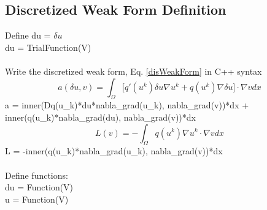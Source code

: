 \documentclass[12pt,3p]{article}
\begin{document}
\subsection{Discretized Weak Form Definition}
Define du = $\delta u$ \\
{\selectfont
du = TrialFunction(V) \\ \\
}
Write the discretized weak form, Eq. \ref{disWeakForm} in C++ syntax
\begin{equation*}
a(\delta u, v) = \int_{\Omega} \bigg[ q'(u^k) \delta u \nabla u^k + q(u^k)  \nabla \delta u \bigg] \cdot \nabla v dx 
\end{equation*}
{\selectfont
a = inner(Dq(u\_k)*du*nabla\_grad(u\_k), nabla\_grad(v))*dx + \\
\indent inner(q(u\_k)*nabla\_grad(du), nabla\_grad(v))*dx  \\
}
\begin{equation*}
L(v) = - \int_{\Omega} q(u^k) \nabla u^k \cdot \nabla v dx
\end{equation*}
{\selectfont
L = -inner(q(u\_k)*nabla\_grad(u\_k), nabla\_grad(v))*dx \\ \\
}
Define functions: \\
{\selectfont
du = Function(V) \\
u  = Function(V)  
}
\end{document}
